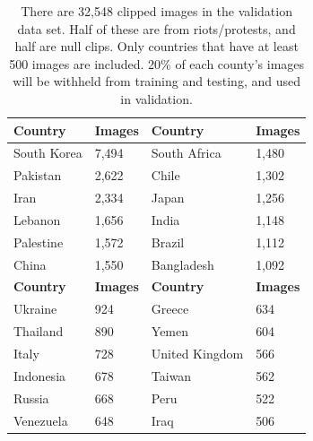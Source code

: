 \begin{table}
\centering
\begin{tabular}{|l|l||l|l|}
\hline
\textbf{Country} & \textbf{Images} & \textbf{Country} & \textbf{Images}  \\ \hline
South Korea      & 7,494           & South Africa     & 1,480           \\ \hline
Pakistan         & 2,622           & Chile            & 1,302           \\ \hline
Iran             & 2,334           & Japan            & 1,256           \\ \hline
Lebanon          & 1,656           & India            & 1,148           \\ \hline
Palestine        & 1,572           & Brazil           & 1,112           \\ \hline
China            & 1,550           & Bangladesh       & 1,092           \\ \hline
\hline
\textbf{Country} & \textbf{Images} & \textbf{Country} & \textbf{Images} \\ \hline
Ukraine          & 924             & Greece           & 634          \\ \hline
Thailand         & 890             & Yemen            & 604           \\ \hline
Italy            & 728             & United Kingdom   & 566          \\ \hline
Indonesia        & 678             & Taiwan           & 562          \\ \hline
Russia           & 668             & Peru             & 522           \\ \hline
Venezuela        & 648             & Iraq             & 506           \\ \hline
\end{tabular}
\caption{There are 32,548 clipped images in the validation data set.  Half of these are from riots/protests, and half are null clips.  Only countries that have at least 500 images are included.  20\% of each county's images will be withheld from training and testing, and used in validation.}
\label{tab:val_data_selection}
\end{table}

